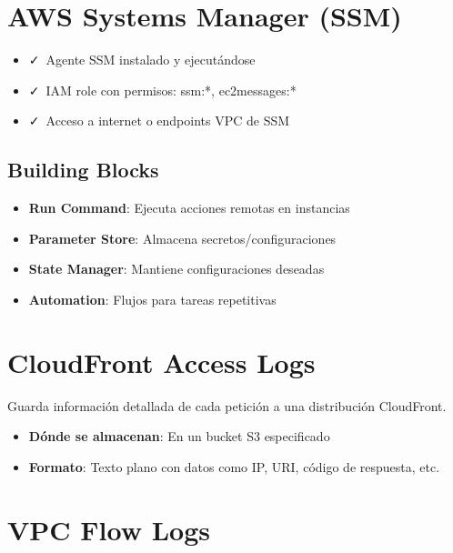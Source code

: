 \documentclass[12pt,a4paper]{report}
\newcommand{\vcheckmark}{\textcolor{successgreen}{\faCheck}}
\begin{document}
\section{AWS Systems Manager (SSM)}

\begin{awsbox}
\begin{itemize}
    \item \vcheckmark\ Agente SSM instalado y ejecutándose
    \item \vcheckmark\ IAM role con permisos: ssm:*, ec2messages:*
    \item \vcheckmark\ Acceso a internet o endpoints VPC de SSM
\end{itemize}
\end{awsbox}

\subsection{Building Blocks}

\begin{itemize}
    \item \textbf{Run Command}: Ejecuta acciones remotas en instancias
    \item \textbf{Parameter Store}: Almacena secretos/configuraciones
    \item \textbf{State Manager}: Mantiene configuraciones deseadas
    \item \textbf{Automation}: Flujos para tareas repetitivas
\end{itemize}

\section{CloudFront Access Logs}

\begin{conceptbox}
Guarda información detallada de cada petición a una distribución CloudFront.
\end{conceptbox}

\begin{itemize}
    \item \textbf{Dónde se almacenan}: En un bucket S3 especificado
    \item \textbf{Formato}: Texto plano con datos como IP, URI, código de respuesta, etc.
\end{itemize}

\section{VPC Flow Logs}
\end{document}
